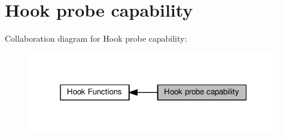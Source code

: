 \hypertarget{group__apr__hook__probes}{}\section{Hook probe capability}
\label{group__apr__hook__probes}
Collaboration diagram for Hook probe capability\+:
\nopagebreak
\begin{figure}[H]
\begin{center}
\leavevmode
\includegraphics[width=313pt]{group__apr__hook__probes}
\end{center}
\end{figure}
